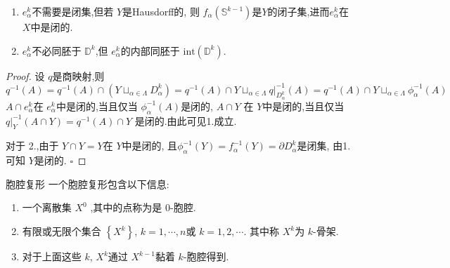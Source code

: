 \documentclass[../../几何与拓扑.tex]{subfiles}
\begin{document}
\begin{remark}
    \begin{enumerate}
        \item  \(  e_{\alpha }^{k}  \)不需要是闭集,但若 \(  Y  \)是Hausdorff的, 则 \(  f_{\alpha }\left( \mathbb{S}^{k-1} \right)   \)是\(  Y  \)的闭子集,进而\(e_{\alpha }^{k}  \)在 \(  X  \)中是闭的. 
        \item  \(  e_{\alpha }^{k}  \)不必同胚于 \(  \mathbb{D}^{k}  \),但 \(  e_{\alpha }^{k}  \)的内部同胚于 \(  \mathrm{int} \left( \mathbb{D}^{k} \right)   \).    
    \end{enumerate}
        
\end{remark}

\begin{proof}
    设 \(  q  \)是商映射,则 
    \[
    q^{-1} \left( A \right)=  q^{-1} \left( A \right) \cap \left( Y \sqcup _{\alpha \in  \Lambda }D_{\alpha }^{k} \right)=    q^{-1} \left( A \right)\cap Y  \sqcup _{\alpha  \in  \Lambda }  q|_{D_{\alpha }^{k}}^{-1} \left( A \right)  =  q^{-1} \left( A \right)\cap Y  \sqcup _{\alpha \in  \Lambda } \phi _{\alpha }^{-1} \left( A \right) 
    \]  \(  A\cap e_{\alpha }^{k}  \)在 \(  e_{\alpha }^{k}  \)中是闭的,当且仅当 \(  \phi _{\alpha }^{-1} \left( A \right)   \)是闭的, \(  A\cap Y  \)    在 \(  Y  \)中是闭的,当且仅当 \(  q|_{Y}^{-1} \left( A\cap Y \right)=  q^{-1} \left( A \right)\cap Y    \)  是闭的.由此可见1.成立.
    
    对于 2.,由于 \(  Y\cap Y=  Y  \)在 \(  Y  \)中是闭的, 且\(  \phi _{\alpha }^{-1} \left( Y \right)=  f_{\alpha }^{-1} \left( Y \right) =  \partial D_{\alpha }^{k}   \)是闭集, 由1.可知 \(  Y  \)是闭的.   
    \hfill $\square$
\end{proof}


\begin{definition}{胞腔复形}
    一个胞腔复形包含以下信息:
    \begin{enumerate}
        \item 一个离散集 \(  X^{0}  \) ,其中的点称为是 \(  0  \)-胞腔. 
        \item 有限或无限个集合  \(  \left\{ X^{k} \right\}  \), \(  k=  1,\cdots,n   \)或 \(  k =  1,2,\cdots   \).  其中称 \(  X^{k}  \)为 \(  k \)-骨架.
        \item 对于上面这些 \(  k  \), \(  X^{k}  \)通过 \(  X^{k-1}  \)黏着 \(  k  \)-胞腔得到.      
    \end{enumerate}
    
\end{definition}
\end{document}
